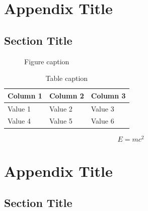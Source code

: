 

\chapter{Appendix Title}

\section{Section Title}

\begin{figure}[H]
    \centering
    \caption{Figure caption}
    \label{fig:appendix1}
\end{figure}

\begin{table}[H]
    \centering
    \caption{Table caption}
    \label{tab:appendix1}
    \begin{tabular}{lll}
        \toprule
        Column 1 & Column 2 & Column 3 \\
        \midrule
        Value 1  & Value 2  & Value 3  \\
        Value 4  & Value 5  & Value 6  \\
        \bottomrule
    \end{tabular}
\end{table}

\begin{equation}
    E = mc^2
    \label{eq:appendix1}
\end{equation}


\chapter{Appendix Title}

\section{Section Title}
